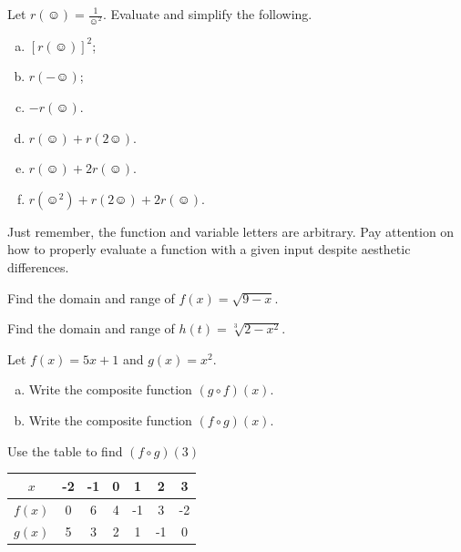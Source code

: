     \begin{problem}
    Let $r(\smiley)=\frac{1}{\smiley^2}$. Evaluate and simplify the following.
    \begin{enumerate}[(a)]
        \item $\left[r(\smiley)\right]^2$;
        \item $r(-\smiley)$;
        \item $-r(\smiley)$.
        \item $r(\smiley)+r(2\smiley)$.
        \item $r(\smiley)+2r(\smiley)$.
        \item $r(\smiley^2)+r(2\smiley)+2r(\smiley)$.
    \end{enumerate}
    \end{problem}
    
    \begin{remark}
    Just remember, the function and variable letters are arbitrary. Pay attention on how to properly evaluate a function with a given input despite aesthetic differences.
    \end{remark}
    
    \begin{problem}
    Find the domain and range of $f(x)=\sqrt{9-x}$.
    \end{problem}
    
    \begin{problem}
    Find the domain and range of $h(t)=\sqrt[3]{2-x^2}$.
    \end{problem}
    
    \begin{problem}
    Let $f(x)=5x+1$ and $g(x)=x^2$.
    \begin{enumerate}[(a)]
        \item Write the composite function $(g\circ f)(x)$.
        \item Write the composite function $(f\circ g)(x)$.
    \end{enumerate}
    \end{problem}
    
    \begin{problem}
    Use the table to find $(f\circ g)(3)$
    \begin{center}
    \begin{tabular}{|c||c|c|c|c|c|c|}
        \hline
        $x$ & -2 & -1 & 0 & 1 & 2 & 3 \\
        \hline
        $f(x)$ & 0 & 6 & 4 & -1 & 3 & -2\\
        \hline
        $g(x)$ & 5 & 3 & 2 & 1 & -1 & 0\\
        \hline
    \end{tabular}
    \end{center}
    \end{problem}
    
